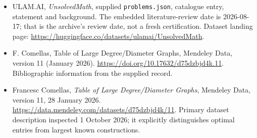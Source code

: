 \documentclass[11pt,a4paper]{article}
\begin{document}
{\small

\begin{itemize}

\item[\hypertarget{source:statement:1}{S1}] ULAM.AI, \emph{UnsolvedMath}, supplied \texttt{problems.json}, catalogue entry, statement and background. The embedded literature-review date is 2026-08-17; that is the archive’s review date, not a fresh certification. Dataset landing page: \url{https://huggingface.co/datasets/ulamai/UnsolvedMath}.

\item[\hypertarget{source:statement:2}{S2}] F. Comellas, Table of Large Degree/Diameter Graphs, Mendeley Data, version 11 (January 2026). \url{https://doi.org/10.17632/d75dzbjd4k.11}. Bibliographic information from the supplied record.


\item[E1] Francesc Comellas, \emph{Table of Large
Degree/Diameter Graphs}, Mendeley Data, version 11, 28 January 2026.
\url{https://data.mendeley.com/datasets/d75dzbjd4k/11}.
Primary dataset description inspected 1 October 2026; it explicitly
distinguishes optimal entries from largest known constructions.

\end{itemize}

}

\label{end:statement}
\end{document}
